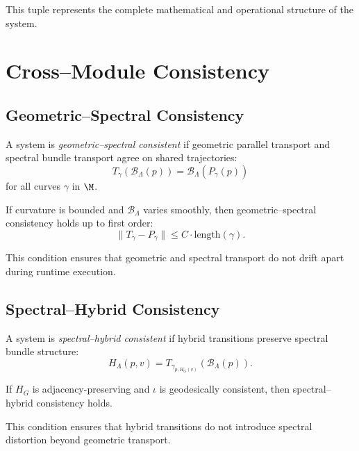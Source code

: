 \documentclass[11pt]{article}
\begin{document}
\begin{remark}
This tuple represents the complete mathematical and operational structure
of the system.
\end{remark}

\section{Cross--Module Consistency}

\subsection{Geometric--Spectral Consistency}

\begin{definition}
A system is \emph{geometric--spectral consistent} if geometric parallel
transport and spectral bundle transport agree on shared trajectories:
\[
T_{\gamma}( \mathcal{B}_\Lambda(p) )
= \mathcal{B}_\Lambda( P_{\gamma}(p) )
\]
for all curves $\gamma$ in $\M$.
\end{definition}

\begin{lemma}
If curvature is bounded and $\mathcal{B}_\Lambda$ varies smoothly, then
geometric--spectral consistency holds up to first order:
\[
\| T_{\gamma} - P_{\gamma} \|
\le C \cdot \mathrm{length}(\gamma).
\]
\end{lemma}

\begin{remark}
This condition ensures that geometric and spectral transport do not drift
apart during runtime execution.
\end{remark}

\subsection{Spectral--Hybrid Consistency}

\begin{definition}
A system is \emph{spectral--hybrid consistent} if hybrid transitions
preserve spectral bundle structure:
\[
H_\Lambda(p,v)
= T_{\gamma_{p,H_G(v)}}(\mathcal{B}_\Lambda(p)).
\]
\end{definition}

\begin{lemma}
If $H_G$ is adjacency-preserving and $\iota$ is geodesically consistent,
then spectral--hybrid consistency holds.
\end{lemma}

\begin{remark}
This condition ensures that hybrid transitions do not introduce spectral
distortion beyond geometric transport.
\end{remark}
\end{document}
